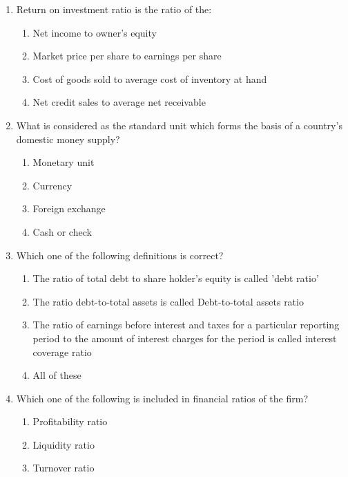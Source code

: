 \documentclass[11pt,a4paper]{article}
\begin{document}
\begin{enumerate}
\\
\item{Return on investment ratio is the ratio of the:}
\begin{enumerate}[label=\Alph*.]
\item{Net income to owner's equity}
\item{Market price per share to earnings per share}
\item{Cost of goods sold to average cost of inventory at hand}
\item{Net credit sales to average net receivable}
\end{enumerate}
\item{What is considered as the standard unit which forms the basis of a country's domestic money supply?
}
\begin{enumerate}[label=\Alph*.]
\item{Monetary unit}
\item{Currency}
\item{Foreign exchange}
\item{Cash or check}
\end{enumerate}
\item{Which one of the following definitions is correct?}
\begin{enumerate}[label=\Alph*.]
\item{The ratio of total debt to share holder's equity is called 'debt ratio'}
\item{The ratio debt-to-total assets is called Debt-to-total assets ratio}
\item{The ratio of earnings before interest and taxes for a particular reporting period to the amount of interest charges for the period is called interest coverage ratio}
\item{All of these}
\end{enumerate}
\item{Which one of the following is included in financial ratios of the firm?}
\begin{enumerate}[label=\Alph*.]
\item{Profitability ratio}
\item{Liquidity ratio}
\item{Turnover ratio}

\end{enumerate}
\end{enumerate}
\end{document}
